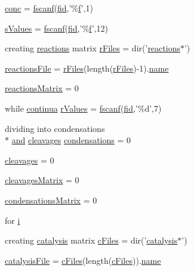 \begin{DoxyCompactItemize}
\hyperlink{a00027_a941dee33725f074478fdcbf15e1c35ae}{conc} = \hyperlink{a00025_a028ac102a731e62fb0a7439381f566c1}{fscanf}(\hyperlink{a00031_ae9011d40c6f13e68e6f07156e0da7c5d}{fid},'\%\hyperlink{a00025_a9c5a71c46b1abb8b7df5ebeac6c81535}{f}',1)
\item 
\hyperlink{a00027_a02a2184ac978f50472408ca644862302}{s\-Values} = \hyperlink{a00025_a028ac102a731e62fb0a7439381f566c1}{fscanf}(\hyperlink{a00031_ae9011d40c6f13e68e6f07156e0da7c5d}{fid},'\%\hyperlink{a00025_a9c5a71c46b1abb8b7df5ebeac6c81535}{f}',12)
\item 
creating \hyperlink{a00021}{reactions} matrix \hyperlink{a00027_ad75735665492cabd747370126464fddf}{r\-Files} = dir('\hyperlink{a00021}{reactions}$\ast$')
\item 
\hyperlink{a00027_a4c72dba1fe2ee2fbcc699262a8d0c624}{reactions\-File} = \hyperlink{a00030_ad75735665492cabd747370126464fddf}{r\-Files}(length(\hyperlink{a00030_ad75735665492cabd747370126464fddf}{r\-Files})-\/1).\hyperlink{a00027_abbf559a76fab59203496b0847ab9502a}{name}
\item 
\hyperlink{a00027_ac52097a2745fcef31eb175d2e9485845}{reactions\-Matrix} = 0
\item 
while \hyperlink{a00030_a9c951ebd5bc3f1adce943bee1255f4d6}{continua} \hyperlink{a00027_a436a6968124e560649654a4abbd9dac6}{r\-Values} = \hyperlink{a00025_a028ac102a731e62fb0a7439381f566c1}{fscanf}(\hyperlink{a00031_ae9011d40c6f13e68e6f07156e0da7c5d}{fid},'\%d',7)
\item 
dividing into condensations \\*
\hyperlink{a00028_a170f8acb213f91bf71c77b1d20bceb33}{and} \hyperlink{a00030_a89060c6979e5a4ff7b0985b35f295695}{cleavages} \hyperlink{a00027_ad3aa27d88a7e9d77d8334155860269bb}{condensations} = 0
\item 
\hyperlink{a00027_a89060c6979e5a4ff7b0985b35f295695}{cleavages} = 0
\item 
\hyperlink{a00027_a1a691fb4f955887edfa538e91479fafe}{cleavages\-Matrix} = 0
\item 
\hyperlink{a00027_afaba8eef2f8f4e4dda2e893a19e55a94}{condensations\-Matrix} = 0
\item 
for \hyperlink{a00027_a1de1a45bc56b002aa1ad94bb5f54a1ca}{i}
\item 
creating \hyperlink{a00012}{catalysis} matrix \hyperlink{a00027_a9eab57ccb42a39c704f47dc30e4f4515}{c\-Files} = dir('\hyperlink{a00012}{catalysis}$\ast$')
\item 
\hyperlink{a00027_a33e70cf5b45cb59005b82d30202f0b69}{catalysis\-File} = \hyperlink{a00030_a9eab57ccb42a39c704f47dc30e4f4515}{c\-Files}(length(\hyperlink{a00030_a9eab57ccb42a39c704f47dc30e4f4515}{c\-Files})).\hyperlink{a00027_abbf559a76fab59203496b0847ab9502a}{name}

\end{DoxyCompactItemize}
